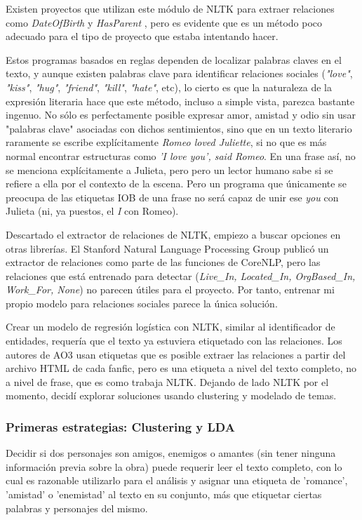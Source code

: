 \documentclass{pre-tfg}
\begin{document}
Existen proyectos que utilizan este módulo de NLTK para extraer relaciones como \textit{DateOfBirth} y \textit{HasParent} \cite{jose_2017}, pero es evidente que es un método poco adecuado para el tipo de proyecto que estaba intentando hacer.

Estos programas basados en reglas dependen de localizar palabras claves en el texto, y aunque existen palabras clave para identificar relaciones sociales (\textit{"love"}, \textit{"kiss"}, \textit{"hug"}, \textit{"friend"}, \textit{"kill"}, \textit{"hate"}, etc), lo cierto es que la naturaleza de la expresión literaria hace que este método, incluso a simple vista, parezca bastante ingenuo. No sólo es perfectamente posible expresar amor, amistad y odio sin usar "palabras clave" asociadas con dichos sentimientos, sino que en un texto literario raramente se escribe explícitamente \textit{Romeo loved Juliette}, si no que es más normal encontrar estructuras como \textit{'I love you', said Romeo}. En una frase así, no se menciona explícitamente a Julieta, pero pero un lector humano sabe si se refiere a ella por el contexto de la escena. Pero un programa que únicamente se preocupa de las etiquetas IOB de una frase no será capaz de unir ese \textit{you} con Julieta (ni, ya puestos, el \textit{I} con Romeo).

Descartado el extractor de relaciones de NLTK, empiezo a buscar opciones en otras librerías. El Stanford Natural Language Processing Group publicó un extractor de relaciones como parte de las funciones de CoreNLP, pero las relaciones que está entrenado para detectar (\textit{Live\_In, Located\_In, OrgBased\_In, Work\_For, None}) no parecen útiles para el proyecto. Por tanto, entrenar mi propio modelo para relaciones sociales parece la única solución.

Crear un modelo de regresión logística con NLTK, similar al identificador de entidades, requería que el texto ya estuviera etiquetado con las relaciones. Los autores de AO3 usan etiquetas que es posible extraer las relaciones a partir del archivo HTML de cada fanfic, pero es una etiqueta a nivel del texto completo, no a nivel de frase, que es como trabaja NLTK. Dejando de lado NLTK por el momento, decidí explorar soluciones usando clustering y modelado de temas.

\subsubsection{Primeras estrategias: Clustering y LDA}
Decidir si dos personajes son amigos, enemigos o amantes (sin tener ninguna información previa sobre la obra) puede requerir leer el texto completo, con lo cual es razonable utilizarlo para el análisis y asignar una etiqueta de 'romance', 'amistad' o 'enemistad' al texto en su conjunto, más que etiquetar ciertas palabras y personajes del mismo.
\end{document}
